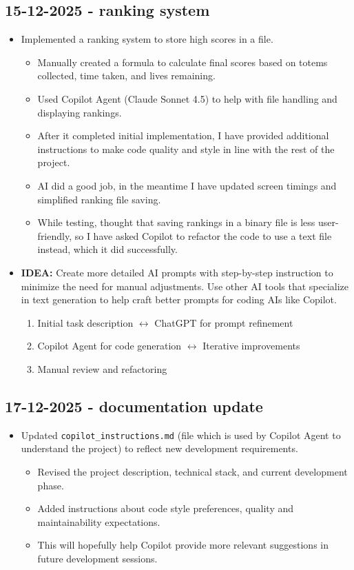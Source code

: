 \documentclass[11pt,a4paper]{article}
\begin{document}
\subsection{15-12-2025 - ranking system}
\begin{itemize}
    \item Implemented a ranking system to store high scores in a file.
    \begin{itemize}
        \item Manually created a formula to calculate final scores based on totems collected, time taken, and lives remaining.
        \item Used Copilot Agent (Claude Sonnet 4.5) to help with file handling and displaying rankings.
        \item After it completed initial implementation, I have provided additional instructions to make code quality and style in line with the rest of the project.
        \item AI did a good job, in the meantime I have updated screen timings and simplified ranking file saving.
        \item While testing, thought that saving rankings in a binary file is less user-friendly, so I have asked Copilot to refactor the code to use a text file instead, which it did successfully.
    \end{itemize}
    
    \item \textbf{IDEA:} Create more detailed AI prompts with step-by-step instruction to minimize the need for manual adjustments. Use other AI tools that specialize in text generation to help craft better prompts for coding AIs like Copilot.
    \begin{enumerate}
        \item Initial task description $\leftrightarrow$ ChatGPT for prompt refinement
        \item Copilot Agent for code generation $\leftrightarrow$ Iterative improvements
        \item Manual review and refactoring
    \end{enumerate}
\end{itemize}

\subsection{17-12-2025 - documentation update}
\begin{itemize}
    \item Updated \texttt{copilot\_instructions.md} (file which is used by Copilot Agent to understand the project) to reflect new development requirements.
    \begin{itemize}
        \item Revised the project description, technical stack, and current development phase.
        \item Added instructions about code style preferences, quality and maintainability expectations.
        \item This will hopefully help Copilot provide more relevant suggestions in future development sessions.
    \end{itemize}
\end{itemize}
\end{document}
